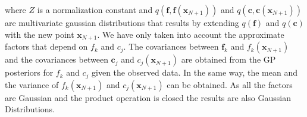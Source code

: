 where $Z$ is a normalization constant and $q(\boldsymbol{f},\boldsymbol{f}(\boldsymbol{x}_{N+1}))$ and $q(\boldsymbol{c},\boldsymbol{c}(\boldsymbol{x}_{N+1}))$ are multivariate gaussian distributions that results by extending $q(\boldsymbol{f})$ and $q(\boldsymbol{c})$ with the new point $\boldsymbol{x}_{N+1}$. We have only taken into account the approximate factors that depend on $f_k$ and $c_j$. The covariances between $\boldsymbol{f}_k$ and $f_k(\boldsymbol{x}_{N+1})$ and the covariances between $\boldsymbol{c}_j$ and $c_j(\boldsymbol{x}_{N+1})$ are obtained from the GP posteriors for $f_k$ and $c_j$ given the observed data. In the same way, the mean and the variance of $f_k(\boldsymbol{x}_{N+1})$ and $c_j(\boldsymbol{x}_{N+1})$ can be obtained. As all the factors are Gaussian and the product operation is closed the results are also Gaussian Distributions.

